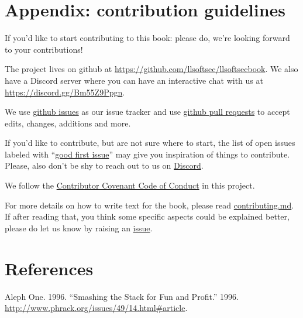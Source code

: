 \documentclass[a4paper,]{report}
\begin{document}
\hypertarget{appendix-contribution-guidelines}{%
\chapter*{Appendix: contribution
guidelines}\label{appendix-contribution-guidelines}}

If you'd like to start contributing to this book: please do, we're
looking forward to your contributions!

The project lives on github at
\url{https://github.com/llsoftsec/llsoftsecbook}. We also have a Discord
server where you can have an interactive chat with us at
\url{https://discord.gg/Bm55Z9Ppgn}.

We use \href{https://github.com/llsoftsec/llsoftsecbook/issues}{github
issues} as our issue tracker and use
\href{https://github.com/llsoftsec/llsoftsecbook/pulls}{github pull
requests} to accept edits, changes, additions and more.

If you'd like to contribute, but are not sure where to start, the list
of open issues labeled with
``\href{https://github.com/llsoftsec/llsoftsecbook/issues?q=is\%3Aissue+is\%3Aopen+label\%3A\%22good+first+issue\%22}{good
first issue}'' may give you inspiration of things to contribute. Please,
also don't be shy to reach out to us on
\href{https://discord.gg/Bm55Z9Ppgn}{Discord}.

We follow the
\href{https://github.com/llsoftsec/llsoftsecbook/blob/main/CODE_OF_CONDUCT.md}{Contributor
Covenant Code of Conduct} in this project.

For more details on how to write text for the book, please read
\href{https://github.com/llsoftsec/llsoftsecbook/blob/main/contributing.md}{contributing.md}.
If after reading that, you think some specific aspects could be
explained better, please do let us know by raising an
\href{https://github.com/llsoftsec/llsoftsecbook/issues/new}{issue}.

\printindex

\listoftodos

\hypertarget{references}{%
\chapter*{References}\label{references}}

\hypertarget{refs}{}
\leavevmode\hypertarget{ref-AlephOne1996}{}%
Aleph One. 1996. ``Smashing the Stack for Fun and Profit.'' 1996.
\url{http://www.phrack.org/issues/49/14.html\#article}.
\end{document}
